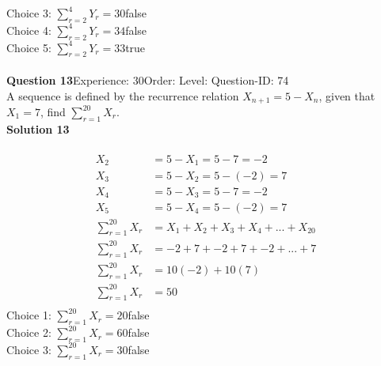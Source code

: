 \documentclass{article}
\begin{document}
Choice 3: \hspace{20pt}$\displaystyle\sum_{r=2}^{4} Y_r=30$\hspace{20pt}false\\
Choice 4: \hspace{20pt}$\displaystyle\sum_{r=2}^{4} Y_r=34$\hspace{20pt}false\\
Choice 5: \hspace{20pt}$\displaystyle\sum_{r=2}^{4} Y_r=33$\hspace{20pt}true\\
\\[4pt]
\noindent\textbf{Question 13}\hspace{20pt}Experience: 30\hspace{20pt}Order: \hspace{20pt}Level: \hspace{20pt}Question-ID: 74\\[2pt]
A sequence is defined by the recurrence relation $X_{n+1}=5-X_n$, given that  $X_1 =7$, find $\displaystyle\sum_{r=1}^{20} X_r$.\\[4pt]
\noindent\textbf{Solution 13}\\[2pt]
\\[-35pt]\begin{align*}
X_2&=5-X_1=5-7=-2\\[7pt]
X_3&=5-X_2=5-(-2)=7\\[7pt]
X_4&=5-X_3=5-7=-2\\[7pt]
X_5&=5-X_4=5-(-2)=7\\[7pt]
\displaystyle\sum_{r=1}^{20} X_r &= X_1+X_2+X_3+X_4+...+X_{20}\\[2pt]
\displaystyle\sum_{r=1}^{20} X_r &= -2+7+-2+7+-2+...+7\\[2pt]
\displaystyle\sum_{r=1}^{20} X_r &= 10(-2)+10(7)\\[2pt]
\displaystyle\sum_{r=1}^{20} X_r &= 50\\[2pt]
\end{align*}
Choice 1: \hspace{20pt}$\displaystyle\sum_{r=1}^{20} X_r= 20$\hspace{20pt}false\\
Choice 2: \hspace{20pt}$\displaystyle\sum_{r=1}^{20} X_r= 60$\hspace{20pt}false\\
Choice 3: \hspace{20pt}$\displaystyle\sum_{r=1}^{20} X_r= 30$\hspace{20pt}false\\
\end{document}
